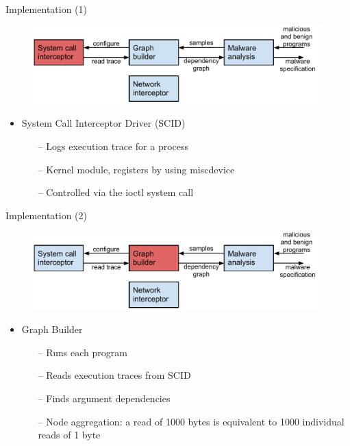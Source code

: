 \documentclass{beamer}
\begin{document}
\begin{frame}[t]{Implementation (1)}
  \begin{figure}[ht]
    \includegraphics[width=4.4in]{img/mal-sharp-architecture-scid.pdf}
    \end{figure}
  \begin{itemize}
    \item System Call Interceptor Driver (SCID)
    \begin{itemize}
      \item[--] Logs execution trace for a process
      \item[--] Kernel module, registers by using miscdevice
      \item[--] Controlled via the ioctl system call
    \end{itemize}
  \end{itemize}
\end{frame}

\begin{frame}[t]{Implementation (2)}
  \begin{figure}[p]
    \includegraphics[width=4.4in]{img/mal-sharp-architecture-gb.pdf}
  \end{figure}
  \begin{itemize} 
    \item Graph Builder
    \begin{itemize}
      \item[--] Runs each program
      \item[--] Reads execution traces from SCID
      \item[--] Finds argument dependencies
      \item[--] Node aggregation: a read of 1000 bytes is equivalent to 1000 individual reads of 1 byte
    \end{itemize}
  \end{itemize}
\end{frame}
\end{document}
